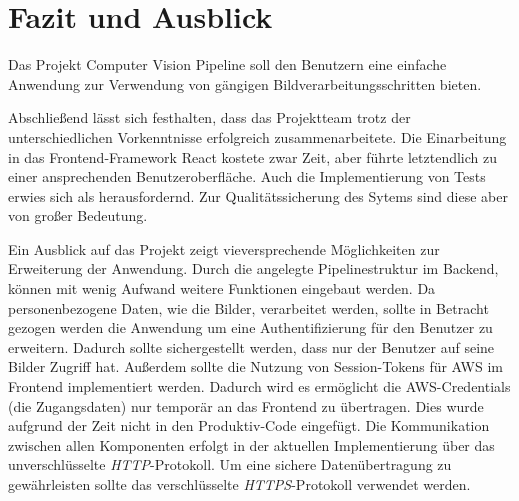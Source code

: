 \section{Fazit und Ausblick}
Das Projekt Computer Vision Pipeline soll den Benutzern eine einfache Anwendung zur Verwendung von gängigen Bildverarbeitungsschritten bieten.

Abschließend lässt sich festhalten, dass das Projektteam trotz der unterschiedlichen Vorkenntnisse erfolgreich zusammenarbeitete. Die Einarbeitung in das Frontend-Framework React kostete zwar Zeit, aber führte letztendlich zu einer ansprechenden Benutzeroberfläche. Auch die Implementierung von Tests erwies sich als herausfordernd. Zur Qualitätssicherung des Sytems sind diese aber von großer Bedeutung.

Ein Ausblick auf das Projekt zeigt vieversprechende Möglichkeiten zur Erweiterung der Anwendung. Durch die angelegte Pipelinestruktur im Backend, können mit wenig Aufwand weitere Funktionen eingebaut werden. Da personenbezogene Daten, wie die Bilder, verarbeitet werden, sollte in Betracht gezogen werden die Anwendung um eine Authentifizierung für den Benutzer zu erweitern. Dadurch sollte sichergestellt werden, dass nur der Benutzer auf seine Bilder Zugriff hat. Außerdem sollte die Nutzung von Session-Tokens für AWS im Frontend implementiert werden. Dadurch wird es ermöglicht die AWS-Credentials (die Zugangsdaten) nur temporär an das Frontend zu übertragen. Dies wurde aufgrund der Zeit nicht in den Produktiv-Code eingefügt. Die Kommunikation zwischen allen Komponenten erfolgt in der aktuellen Implementierung über das unverschlüsselte \textit{HTTP}-Protokoll. Um eine sichere Datenübertragung zu gewährleisten sollte das verschlüsselte \textit{HTTPS}-Protokoll verwendet werden. 
